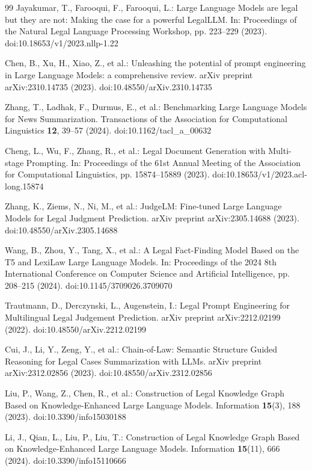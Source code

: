 \documentclass{article}
\theoremstyle{plain}
\theoremstyle{definition}
\begin{document}
\begin{thebibliography}{99}
Jayakumar, T., Farooqui, F., Farooqui, L.: Large Language Models are legal but they are not: Making the case for a powerful LegalLLM. In: Proceedings of the Natural Legal Language Processing Workshop, pp. 223--229 (2023). doi:10.18653/v1/2023.nllp-1.22

Chen, B., Xu, H., Xiao, Z., et al.: Unleashing the potential of prompt engineering in Large Language Models: a comprehensive review. arXiv preprint arXiv:2310.14735 (2023). doi:10.48550/arXiv.2310.14735

Zhang, T., Ladhak, F., Durmus, E., et al.: Benchmarking Large Language Models for News Summarization. Transactions of the Association for Computational Linguistics \textbf{12}, 39--57 (2024). doi:10.1162/tacl\_a\_00632

Cheng, L., Wu, F., Zhang, R., et al.: Legal Document Generation with Multi-stage Prompting. In: Proceedings of the 61st Annual Meeting of the Association for Computational Linguistics, pp. 15874--15889 (2023). doi:10.18653/v1/2023.acl-long.15874

Zhang, K., Ziems, N., Ni, M., et al.: JudgeLM: Fine-tuned Large Language Models for Legal Judgment Prediction. arXiv preprint arXiv:2305.14688 (2023). doi:10.48550/arXiv.2305.14688

Wang, B., Zhou, Y., Tang, X., et al.: A Legal Fact-Finding Model Based on the T5 and LexiLaw Large Language Models. In: Proceedings of the 2024 8th International Conference on Computer Science and Artificial Intelligence, pp. 208--215 (2024). doi:10.1145/3709026.3709070

Trautmann, D., Derczynski, L., Augenstein, I.: Legal Prompt Engineering for Multilingual Legal Judgement Prediction. arXiv preprint arXiv:2212.02199 (2022). doi:10.48550/arXiv.2212.02199

Cui, J., Li, Y., Zeng, Y., et al.: Chain-of-Law: Semantic Structure Guided Reasoning for Legal Cases Summarization with LLMs. arXiv preprint arXiv:2312.02856 (2023). doi:10.48550/arXiv.2312.02856

Liu, P., Wang, Z., Chen, R., et al.: Construction of Legal Knowledge Graph Based on Knowledge-Enhanced Large Language Models. Information \textbf{15}(3), 188 (2023). doi:10.3390/info15030188

Li, J., Qian, L., Liu, P., Liu, T.: Construction of Legal Knowledge Graph Based on Knowledge-Enhanced Large Language Models. Information \textbf{15}(11), 666 (2024). doi:10.3390/info15110666


\end{thebibliography}
\end{document}
